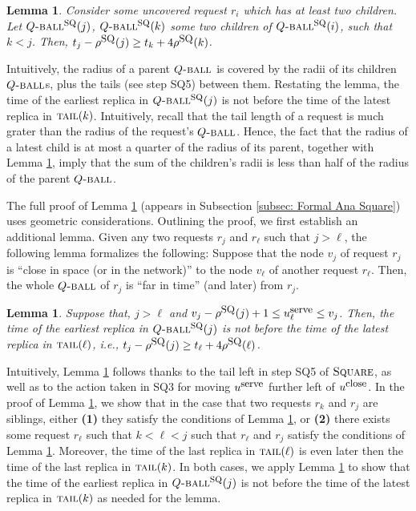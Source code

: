 \documentclass[11pt]{article}
\newtheorem{lem}[theorem]{Lemma}
\newcommand{\Square}[0]{\mbox{\sc Square}}
\newcommand{\rr}{r}
\newcommand{\uSQ}{u^{\mbox{\small\upshape serve}}}
\newcommand{\uclose}{u^{\mbox{\small\upshape close}}}
\newcommand{\tail}[0]{\mbox{\sc tail}}
\newcommand{\rhoSQ}[0]{\rho^{\mbox{\small\upshape SQ}}}
\newcommand{\SQball}[0]{Q{\mbox{\sc -ball}}^{\mbox{\sc sq}}}
\newcommand{\Qball}[0]{Q{\mbox{\sc -ball}}}
\begin{document}
\begin{lem}
Consider some uncovered request $\rr_i$ which has at least two children.
Let $\SQball(j)$, $\SQball(k)$ some two children of $\SQball(i)$, such that $k<j$.
Then,
$t_j-\rhoSQ(j)  \geq t_k + 4 \rhoSQ(k)$. \label{lemma:sqr: tj-tk leq 4 radius k}
\label{app:lemma:sqr: tj-tk leq 4 radius k}
\end{lem}
Intuitively, the radius of a parent $\Qball$ is covered by the radii of its children $\Qball$s, plus the tails (see step SQ5) between them.
Restating the lemma,
the time of the earliest replica in $\SQball(j)$ is not before the time of the latest replica in
$\tail(k)$.
Intuitively,
recall that the tail length of a request is much grater than the radius of the request's $\Qball$.
Hence,  the fact that the
radius of a latest child is at most a quarter of the radius of its parent, together with Lemma \ref{lemma:sqr: tj-tk leq 4 radius k},
imply that the sum of the children’s radii is less than half of the radius of the
parent $\Qball$.









The full proof of Lemma \ref{lemma:sqr: tj-tk leq 4 radius k} (appears in Subsection \ref{subsec: Formal Ana Square}) uses geometric considerations.
Outlining the proof, we first establish an additional lemma.
Given any two requests $r_j$ and $r_\ell$ such that $j>\ell$, the following lemma formalizes the following:
Suppose that the node $v_j$ of request $r_j$ is ``close in space (or in the network)'' to the node $v_\ell$ of another request $r_\ell$.
Then, the whole $\Qball$ of $r_j$ is ``far in time'' (and later) from $r_j$.

\begin{lem}
\label{lemma:suppose two con hold}
Suppose that, $j>\ell$ and $v_j-\rhoSQ(j)+1\leq \uSQ_\ell\leq v_j$.
Then, the time of the earliest replica in $\SQball(j)$ is not before the time of the latest replica in $\tail(\ell)$,
i.e., $t_j-\rhoSQ(j)\geq t_\ell+4\rhoSQ(\ell)$.
\end{lem}
Intuitively, Lemma \ref{lemma:suppose two con hold} follows thanks to the tail left in step SQ5 of $\Square$,
as well as to the action taken in SQ3 for moving $\uSQ$ further left of $\uclose$.
\noindent In the proof of Lemma \ref{lemma:sqr: tj-tk leq 4 radius k}, we show that in the case that two requests $r_k$ and $r_j$ are siblings,
either
{\bf (1)} they satisfy the conditions of Lemma \ref{lemma:suppose two con hold}, or
{\bf (2)} there exists some request $r_\ell$ such that $k<\ell<j$ such that  $r_\ell$ and $r_j$ satisfy the conditions of  Lemma \ref{lemma:suppose two con hold}.
Moreover, the time of the last replica in $\tail(\ell)$ is even later then the time of the last replica in $\tail(k)$.
In both cases, we apply Lemma \ref{lemma:suppose two con hold} to show that
the time of the earliest replica in $\SQball(j)$ is not before the time of the latest replica in $\tail(k)$
as needed for the lemma.
\end{document}
